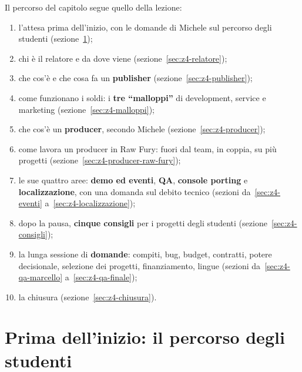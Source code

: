 Il percorso del capitolo segue quello della lezione:
\begin{enumerate}
  \item l'attesa prima dell'inizio, con le domande di Michele sul percorso
        degli studenti (sezione~\ref{sec:z4-attesa});
  \item chi è il relatore e da dove viene (sezione~\ref{sec:z4-relatore});
  \item che cos'è e che cosa fa un \textbf{publisher}
        (sezione~\ref{sec:z4-publisher});
  \item come funzionano i soldi: i \textbf{tre ``malloppi''} di development,
        service e marketing (sezione~\ref{sec:z4-malloppi});
  \item che cos'è un \textbf{producer}, secondo Michele
        (sezione~\ref{sec:z4-producer});
  \item come lavora un producer in Raw Fury: fuori dal team, in coppia, su
        più progetti (sezione~\ref{sec:z4-producer-raw-fury});
  \item le sue quattro aree: \textbf{demo ed eventi}, \textbf{QA},
        \textbf{console porting} e \textbf{localizzazione}, con una domanda sul
        debito tecnico (sezioni da~\ref{sec:z4-eventi}
        a~\ref{sec:z4-localizzazione});
  \item dopo la pausa, \textbf{cinque consigli} per i progetti degli studenti
        (sezione~\ref{sec:z4-consigli});
  \item la lunga sessione di \textbf{domande}: compiti, bug, budget, contratti,
        potere decisionale, selezione dei progetti, finanziamento, lingue
        (sezioni da~\ref{sec:z4-qa-marcello} a~\ref{sec:z4-qa-finale});
  \item la chiusura (sezione~\ref{sec:z4-chiusura}).
\end{enumerate}

\section{Prima dell'inizio: il percorso degli studenti}
\label{sec:z4-attesa}

